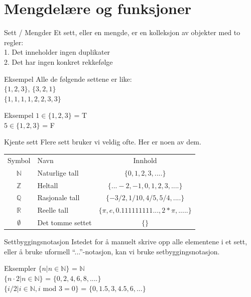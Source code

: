 \section{Mengdelære og funksjoner}
\begin{frame}{Sett / Mengder}
    Et sett, eller en mengde, er en kolleksjon av objekter med to regler:\\
    \indent \hspace{3mm}    1. Det inneholder ingen duplikater\\
    \indent \hspace{3mm}    2. Det har ingen konkret rekkefølge
    
    \begin{block}{Eksempel}
        Alle de følgende settene er like: \\
        $\{1, 2, 3\}$, $\{3, 2, 1\}$ \\
        $\{1, 1, 1, 1, 2, 2, 3, 3\}$
    \end{block}
    
    \begin{block}{Eksempel}
        $1 \in \{1, 2, 3\}$ = T \\
        $5 \in \{1, 2, 3\}$ = F
    \end{block}
\end{frame}


\begin{frame}{Kjente sett}
    Flere sett bruker vi veldig ofte. Her er noen av dem.
    
    \begin{tabular}{c|l|c}
        Symbol & Navn & Innhold \\
        $\mathbb{N}$ & Naturlige tall & $\{0, 1, 2, 3, ....\}$\\
        $\mathbb{Z}$ & Heltall & $\{... -2, -1, 0, 1, 2, 3, ....\}$\\
        $\mathbb{Q}$ & Rasjonale tall & $\{-3/2, 1/10, 4/5, 5/4, ....\}$\\
        $\mathbb{R}$ & Reelle tall & $\{\pi, e, 0.111111111..., 2*\pi, .....\}$\\
        $\emptyset$ & Det tomme settet & $\{\}$
    \end{tabular}
    
\end{frame}

\begin{frame}{Settbyggingsnotasjon}
    Istedet for å manuelt skrive opp alle elementene i et sett, eller å bruke uformell \enquote{...}-notasjon, kan vi bruke setbyggingsnotasjon.
    \begin{block}{Eksempler}
        $\{ n | n \in \mathbb{N}\}$ = $\mathbb{N}$\\
        $\{ n \cdot 2 | n \in \mathbb{N}\}$ = $\{0, 2, 4, 6, 8, ....\}$\\
        $\{ i / 2 | i \in \mathbb{N}, i$ mod $3 = 0\}$ = $\{0, 1.5, 3, 4.5, 6, ...\}$
    \end{block}
\end{frame} 

